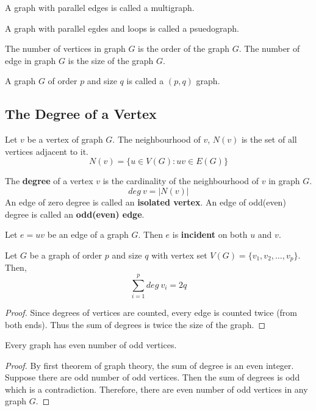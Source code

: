 \begin{definition}[multigraph]
	A graph with parallel edges is called a multigraph.
\end{definition}
\begin{definition}[psueudograph]
	A graph with parallel egdes and loops is called a psuedograph.
\end{definition}

\begin{definition}
	The number of vertices in graph $G$ is the order of the graph $G$.
	The number of edge in graph $G$ is the size of the graph $G$.
\end{definition}
\begin{remark}
	A graph $G$ of order $p$ and size $q$ is called a $(p,q)$ graph.
\end{remark}

\subsection{The Degree of a Vertex}
\begin{definition}[neighbourhood]
	Let $v$ be a vertex of graph $G$.
	The neighbourhood of $v$, $N(v)$ is the set of all vertices adjacent to it.
	$$ N(v) = \{ u \in V(G) : uv \in E(G) \} $$
\end{definition}
\begin{remark}
	The \textbf{degree} of a vertex $v$ is the cardinality of the neighbourhood of $v$ in graph $G$.
	$$ deg\ v = |N(v)| $$
	An edge of zero degree is called an \textbf{isolated vertex}.
	An edge of odd(even) degree is called an \textbf{odd(even) edge}.
\end{remark}

\begin{remark}
	Let $e=uv$ be an edge of a graph $G$.
	Then $e$ is \textbf{incident} on both $u$ and $v$.
\end{remark}

\begin{theorem}
	Let $G$ be a graph of order $p$ and size $q$ with vertex set $V(G) = \{ v_1,v_2,\dots,v_p \}$.
	Then,
	$$ \sum_{i=1}^p deg\ v_i = 2q $$
\end{theorem}
\begin{proof}
	Since degrees of vertices are counted, every edge is counted twice (from both ends). Thus the sum of degrees is twice the size of the graph.
\end{proof}

\begin{corollary}
	Every graph has even number of odd vertices.
\end{corollary}
\begin{proof}
	By first theorem of graph theory, the sum of degree is an even integer.
	Suppose there are odd number of odd vertices.
	Then the sum of degrees is odd which is a contradiction.
	Therefore, there are even number of odd vertices in any graph $G$.
\end{proof}

